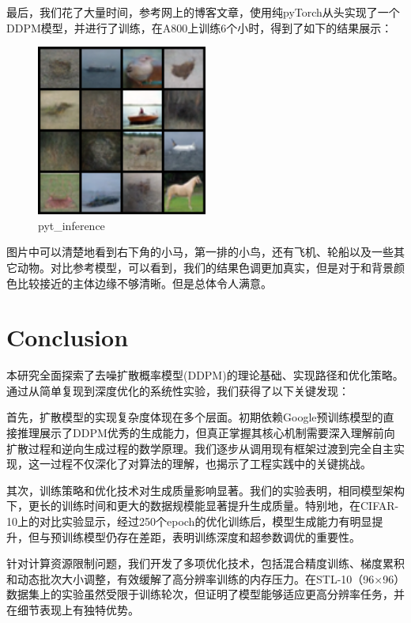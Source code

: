 \documentclass{ctexart}
\begin{document}
最后，我们花了大量时间，参考网上的博客文章，使用纯pyTorch从头实现了一个DDPM模型，并进行了训练，在A800上训练6个小时，得到了如下的结果展示：
\begin{figure}[H]
     \centering
     \includegraphics[width=0.5\textwidth]{sample_pyt.png}
     \caption{pyt\_inference}
     \label{fig:pyt_inference}  %
\end{figure}

图片中可以清楚地看到右下角的小马，第一排的小鸟，还有飞机、轮船以及一些其它动物。对比参考模型，可以看到，我们的结果色调更加真实，但是对于和背景颜色比较接近的主体边缘不够清晰。但是总体令人满意。

\section{Conclusion}

本研究全面探索了去噪扩散概率模型(DDPM)的理论基础、实现路径和优化策略。通过从简单复现到深度优化的系统性实验，我们获得了以下关键发现：


首先，扩散模型的实现复杂度体现在多个层面。初期依赖Google预训练模型的直接推理展示了DDPM优秀的生成能力，但真正掌握其核心机制需要深入理解前向扩散过程和逆向生成过程的数学原理。我们逐步从调用现有框架过渡到完全自主实现，这一过程不仅深化了对算法的理解，也揭示了工程实践中的关键挑战。


其次，训练策略和优化技术对生成质量影响显著。我们的实验表明，相同模型架构下，更长的训练时间和更大的数据规模能显著提升生成质量。特别地，在CIFAR-10上的对比实验显示，经过250个epoch的优化训练后，模型生成能力有明显提升，但与预训练模型仍存在差距，表明训练深度和超参数调优的重要性。


针对计算资源限制问题，我们开发了多项优化技术，包括混合精度训练、梯度累积和动态批次大小调整，有效缓解了高分辨率训练的内存压力。在STL-10（96×96）数据集上的实验虽然受限于训练轮次，但证明了模型能够适应更高分辨率任务，并在细节表现上有独特优势。
\end{document}
